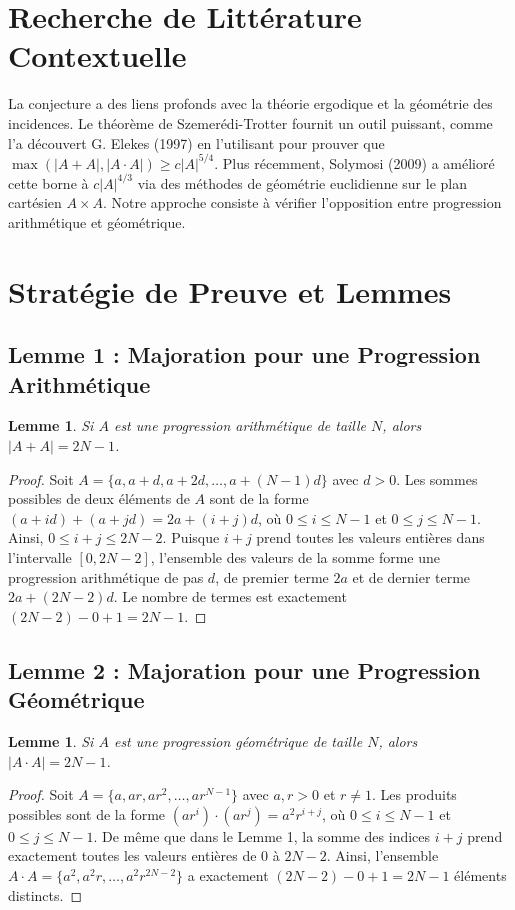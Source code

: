 \documentclass[11pt,a4paper]{article}
\newtheorem{lemma}[theorem]{Lemme}
\begin{document}
\section{Recherche de Littérature Contextuelle}
La conjecture a des liens profonds avec la théorie ergodique et la géométrie des incidences. Le théorème de Szemerédi-Trotter fournit un outil puissant, comme l'a découvert G. Elekes (1997) en l'utilisant pour prouver que $\max(|A+A|, |A \cdot A|) \ge c|A|^{5/4}$. Plus récemment, Solymosi (2009) a amélioré cette borne à $c|A|^{4/3}$ via des méthodes de géométrie euclidienne sur le plan cartésien $A \times A$. Notre approche consiste à vérifier l'opposition entre progression arithmétique et géométrique.

\section{Stratégie de Preuve et Lemmes}

\subsection{Lemme 1 : Majoration pour une Progression Arithmétique}
\begin{lemma}
Si $A$ est une progression arithmétique de taille $N$, alors $|A+A| = 2N - 1$.
\end{lemma}
\begin{proof}
Soit $A = \{a, a+d, a+2d, \dots, a+(N-1)d\}$ avec $d > 0$. Les sommes possibles de deux éléments de $A$ sont de la forme $(a+id) + (a+jd) = 2a + (i+j)d$, où $0 \le i \le N-1$ et $0 \le j \le N-1$. Ainsi, $0 \le i+j \le 2N-2$. Puisque $i+j$ prend toutes les valeurs entières dans l'intervalle $[0, 2N-2]$, l'ensemble des valeurs de la somme forme une progression arithmétique de pas $d$, de premier terme $2a$ et de dernier terme $2a + (2N-2)d$. Le nombre de termes est exactement $(2N-2) - 0 + 1 = 2N-1$.
\end{proof}

\subsection{Lemme 2 : Majoration pour une Progression Géométrique}
\begin{lemma}
Si $A$ est une progression géométrique de taille $N$, alors $|A \cdot A| = 2N - 1$.
\end{lemma}
\begin{proof}
Soit $A = \{a, ar, ar^2, \dots, ar^{N-1}\}$ avec $a, r > 0$ et $r \neq 1$. Les produits possibles sont de la forme $(ar^i) \cdot (ar^j) = a^2 r^{i+j}$, où $0 \le i \le N-1$ et $0 \le j \le N-1$. De même que dans le Lemme 1, la somme des indices $i+j$ prend exactement toutes les valeurs entières de $0$ à $2N-2$. Ainsi, l'ensemble $A \cdot A = \{a^2, a^2 r, \dots, a^2 r^{2N-2}\}$ a exactement $(2N-2) - 0 + 1 = 2N-1$ éléments distincts.
\end{proof}
\end{document}
